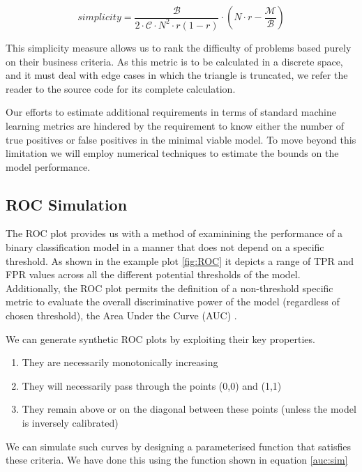 \documentclass[12pt,a4paper]{article}
\numberwithin{equation}{section}
\begin{document}
\begin{equation}
simplicity = \frac{\mathcal{B}}{2 \cdot \mathcal{C} \cdot N^2 \cdot r(1-r)} \cdot  \left(N \cdot r - \frac{\mathcal{M}}{\mathcal{B}} \right)
\label{eq:simplicity}
\end{equation}

This simplicity measure allows us to rank the difficulty of problems based purely on their business criteria. As this metric is to be 
calculated in a discrete space, and it must deal with edge cases in which the triangle is truncated, we refer the reader to the source code
for its complete calculation.

Our efforts to estimate additional requirements in terms of standard machine learning metrics are hindered by the requirement to know
either the number of true positives or false positives in the minimal viable model.
To move beyond this limitation we will employ numerical techniques to estimate the bounds on the model performance.

\subsection{ROC Simulation}

The ROC plot provides us with a method of examinining the performance of a binary classification model 
in a manner that does not depend on a specific threshold. As shown in the example plot \ref{fig:ROC}
it depicts a range of TPR and FPR values across all the different potential thresholds of the model.
Additionally, the ROC plot permits the definition of a non-threshold specific metric to evaluate the overall
discriminative power of the model (regardless of chosen threshold), the Area Under the Curve (AUC) \cite{Bradley97}.

We can generate synthetic ROC plots by exploiting their key properties.

\begin{enumerate}
	\item They are necessarily monotonically increasing
	\item They will necessarily pass through the points (0,0) and (1,1)
	\item They remain above or on the diagonal between these points (unless the model is inversely calibrated)
\end{enumerate}

We can simulate such curves by designing a parameterised function that satisfies these
criteria. We have done this using the function shown in equation \ref{auc:sim} 
\end{document}
